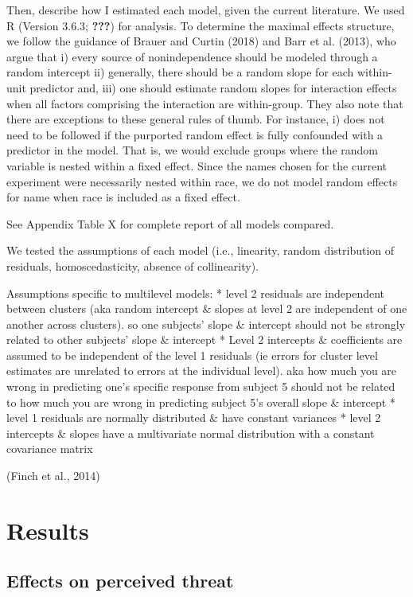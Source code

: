 \documentclass[
  english,
  man]{apa6}
\begin{document}
Then, describe how I estimated each model, given the current literature. We used R (Version 3.6.3; {\textbf{???}}) for analysis. To determine the maximal effects structure, we follow the guidance of Brauer and Curtin (2018) and Barr et al. (2013), who argue that i) every source of nonindependence should be modeled through a random intercept ii) generally, there should be a random slope for each within-unit predictor and, iii) one should estimate random slopes for interaction effects when all factors comprising the interaction are within-group. They also note that there are exceptions to these general rules of thumb. For instance, i) does not need to be followed if the purported random effect is fully confounded with a predictor in the model. That is, we would exclude groups where the random variable is nested within a fixed effect. Since the names chosen for the current experiment were necessarily nested within race, we do not model random effects for name when race is included as a fixed effect.

See Appendix Table X for complete report of all models compared.

We tested the assumptions of each model (i.e., linearity, random distribution of residuals, homoscedasticity, absence of collinearity).

Assumptions specific to multilevel models:
* level 2 residuals are independent between clusters (aka random intercept \& slopes at level 2 are independent of one another across clusters). so one subjects' slope \& intercept should not be strongly related to other subjects' slope \& intercept
*
Level 2 intercepts \& coefficients are assumed to be independent of the level 1 residuals (ie errors for cluster level estimates are unrelated to errors at the individual level). aka how much you are wrong in predicting one's specific response from subject 5 should not be related to how much you are wrong in predicting subject 5's overall slope \& intercept
*
level 1 residuals are normally distributed \& have constant variances
*
level 2 intercepts \& slopes have a multivariate normal distribution with a constant covariance matrix

(Finch et al., 2014)

\hypertarget{results}{%
\section{Results}\label{results}}

\hypertarget{effects-on-perceived-threat}{%
\subsection{Effects on perceived threat}\label{effects-on-perceived-threat}}
\end{document}
